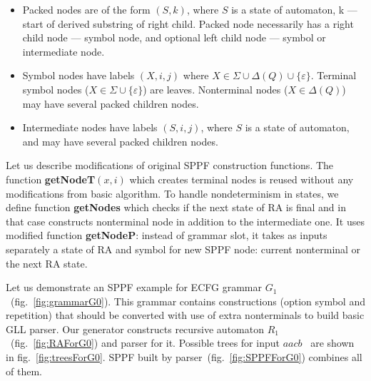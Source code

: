\documentclass[runningheads,a4paper]{llncs}
\begin{document}
\begin{itemize}
\item Packed nodes are of the form $(S, k)$, where $S$ is a state of automaton, k --- start of derived substring of right child.
Packed node necessarily has a right child node --- symbol node, and optional left child node --- symbol or intermediate node.
\item Symbol nodes have labels $(X, i, j)$ where $X \in \Sigma \cup \Delta(Q) \cup \{\varepsilon\}$.
Terminal symbol nodes ($X \in \Sigma \cup \{\varepsilon\}$) are leaves. 
Nonterminal nodes ($X \in \Delta(Q)$) may have several packed children nodes. 
\item Intermediate nodes have labels $ (S, i, j) $, where $S$ is a state of automaton, and may have several packed children nodes. 
\end{itemize}

Let us describe modifications of original SPPF construction functions.
The function \textbf{getNodeT$(x,i)$} which creates terminal nodes is reused without any modifications from basic algorithm.
To handle nondeterminism in states, we define function \textbf{getNodes} which checks if the next state of RA
is final and in that case constructs nonterminal node in addition to the intermediate one.
It uses modified function \textbf{getNodeP}: instead of grammar slot, it takes as inputs separately a 
state of RA and symbol for new SPPF node: current nonterminal or the next RA state.




Let us demonstrate an SPPF example for ECFG grammar $G_1$~(fig.~\ref{fig:grammarG0}).
This grammar contains constructions (option symbol and repetition) that should be converted
with use of extra nonterminals to build basic GLL parser.
Our generator constructs recursive automaton $R_1$~(fig.~\ref{fig:RAForG0}) and parser for it.
Possible trees for input $aacb$ \ are shown in fig.~\ref{fig:treesForG0}.
SPPF built by parser~(fig.~\ref{fig:SPPFForG0}) combines all of them.
\end{document}
